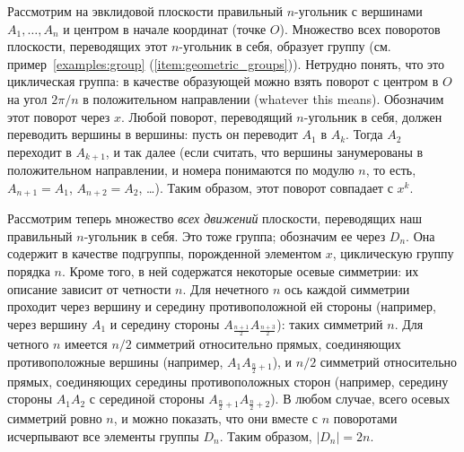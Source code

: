 
Рассмотрим на эвклидовой плоскости правильный $n$-угольник с вершинами
$A_1,\dots,A_n$ и центром в начале координат (точке $O$).
Множество всех поворотов плоскости, переводящих этот $n$-угольник в
себя, образует группу (см. пример~\ref{examples:group}
(\ref{item:geometric_groups})).
Нетрудно понять, что это циклическая группа: в качестве образующей
можно взять поворот с центром в $O$ на угол $2\pi/n$ в положительном
направлении (whatever this means). Обозначим этот поворот через $x$.
Любой поворот, переводящий $n$-угольник в себя, должен переводить
вершины в вершины: пусть он переводит $A_1$ в $A_k$.
Тогда $A_2$ переходит в $A_{k+1}$, и так далее (если считать, что
вершины занумерованы в положительном направлении, и номера понимаются
по модулю $n$, то есть, $A_{n+1} = A_1$, $A_{n+2} = A_2$,
\dots). Таким образом, этот поворот совпадает с $x^k$.

Рассмотрим теперь множество {\it всех движений} плоскости, переводящих
наш правильный $n$-угольник в себя. Это тоже группа; обозначим ее
через $D_n$.
Она содержит в качестве подгруппы, порожденной элементом $x$,
циклическую группу порядка $n$.
Кроме того, в ней содержатся некоторые осевые симметрии: их описание
зависит от четности $n$. Для нечетного $n$ ось каждой симметрии
проходит через вершину и середину противоположной ей стороны
(например, через вершину $A_1$ и середину стороны
$A_{\frac{n+1}{2}}A_{\frac{n+3}{2}}$): таких симметрий $n$.
Для четного $n$ имеется $n/2$ симметрий относительно прямых,
соединяющих противоположные вершины (например,
$A_1A_{\frac{n}{2}+1}$), и $n/2$ симметрий относительно прямых,
соединяющих середины противоположных сторон (например, середину
стороны $A_1A_2$ с серединой стороны
$A_{\frac{n}{2}+1}A_{\frac{n}{2}+2}$).
В любом случае, всего осевых симметрий ровно $n$, и можно показать,
что они вместе с $n$ поворотами исчерпывают все элементы группы
$D_n$. Таким образом, $|D_n| = 2n$.

